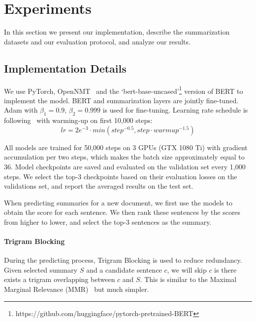     \section{Experiments}
    In this section we present our  implementation, describe the
    summarization datasets and  our evaluation protocol, and analyze our results.
    
    
    \subsection{Implementation Details} 
    
    We use PyTorch, OpenNMT~\cite{klein2017opennmt} and the `bert-base-uncased'\footnote{https://github.com/huggingface/pytorch-pretrained-BERT} version of BERT to implement the model. 
    BERT and summarization layers are jointly fine-tuned.
    Adam with  $\beta_1=0.9$, $\beta_2=0.999$ is used for fine-tuning. Learning rate schedule is following~\cite{vaswani2017attention} with warming-up on first 10,000 steps:
    \begin{equation}
    \nonumber lr = 2e^{-3}\cdot min(step^{-0.5}, step \cdot warmup^{-1.5})
    \end{equation}
    
    
    All models are trained for 50,000 steps on 3 GPUs (GTX 1080 Ti) with gradient accumulation per two steps, which makes the batch size approximately equal to $36$.
    Model checkpoints are saved and evaluated on the validation set every 1,000 steps. We select the top-3 checkpoints based on their evaluation losses on the validations set, and report the averaged results on the test set.
    
    When predicting summaries for a new document, we first use the  models to obtain the score for each sentence.
    We then rank these sentences by the scores from higher to lower, and select the top-3 sentences as the summary.
    
    \paragraph{Trigram Blocking} 
    During the predicting process, Trigram Blocking is used to reduce redundancy.
    Given selected summary $S$ and a candidate sentence $c$, we will skip $c$ is there exists a trigram overlapping between $c$ and $S$. This is similar to the Maximal Marginal Relevance (MMR)~\cite{carbonell1998use}  but much simpler.
    
    
